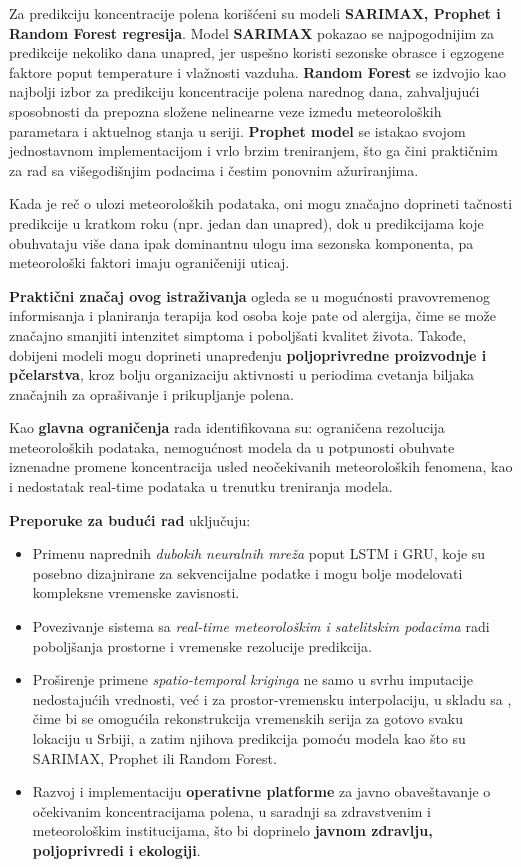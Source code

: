 \documentclass[12pt]{article}
\begin{document}
Za predikciju koncentracije polena korišćeni su modeli \textbf{SARIMAX, Prophet i Random Forest regresija}. Model \textbf{SARIMAX} pokazao se najpogodnijim za predikcije nekoliko dana unapred, jer uspešno koristi sezonske obrasce i egzogene faktore poput temperature i vlažnosti vazduha. \textbf{Random Forest} se izdvojio kao najbolji izbor za predikciju koncentracije polena narednog dana, zahvaljujući sposobnosti da prepozna složene nelinearne veze između meteoroloških parametara i aktuelnog stanja u seriji. \textbf{Prophet model} se istakao svojom jednostavnom implementacijom i vrlo brzim treniranjem, što ga čini praktičnim za rad sa višegodišnjim podacima i čestim ponovnim ažuriranjima.

Kada je reč o ulozi meteoroloških podataka, oni mogu značajno doprineti tačnosti predikcije u kratkom roku (npr. jedan dan unapred), dok u predikcijama koje obuhvataju više dana ipak dominantnu ulogu ima sezonska komponenta, pa meteorološki faktori imaju ograničeniji uticaj.

\textbf{Praktični značaj ovog istraživanja} ogleda se u mogućnosti pravovremenog informisanja i planiranja terapija kod osoba koje pate od alergija, čime se može značajno smanjiti intenzitet simptoma i poboljšati kvalitet života. Takođe, dobijeni modeli mogu doprineti unapređenju \textbf{poljoprivredne proizvodnje i pčelarstva}, kroz bolju organizaciju aktivnosti u periodima cvetanja biljaka značajnih za oprašivanje i prikupljanje polena.

Kao \textbf{glavna ograničenja} rada identifikovana su: ograničena rezolucija meteoroloških podataka, nemogućnost modela da u potpunosti obuhvate iznenadne promene koncentracija usled neočekivanih meteoroloških fenomena, kao i nedostatak real-time podataka u trenutku treniranja modela.

\textbf{Preporuke za budući rad} uključuju:
\begin{itemize}
    \item Primenu naprednih \textit{dubokih neuralnih mreža} poput LSTM i GRU, koje su posebno dizajnirane za sekvencijalne podatke i mogu bolje modelovati kompleksne vremenske zavisnosti.    
    \item Povezivanje sistema sa \textit{real-time meteorološkim i satelitskim podacima} radi poboljšanja prostorne i vremenske rezolucije predikcija.    
    \item Proširenje primene \textit{spatio-temporal kriginga} ne samo u svrhu imputacije nedostajućih vrednosti, već i za prostor-vremensku interpolaciju, u skladu sa \cite{Sekulic2020}, čime bi se omogućila rekonstrukcija vremenskih serija za gotovo svaku lokaciju u Srbiji, a zatim njihova predikcija pomoću modela kao što su SARIMAX, Prophet ili Random Forest.
    \item Razvoj i implementaciju \textbf{operativne platforme} za javno obaveštavanje o očekivanim koncentracijama polena, u saradnji sa zdravstvenim i meteorološkim institucijama, što bi doprinelo \textbf{javnom zdravlju, poljoprivredi i ekologiji}.

\end{itemize}
\end{document}
